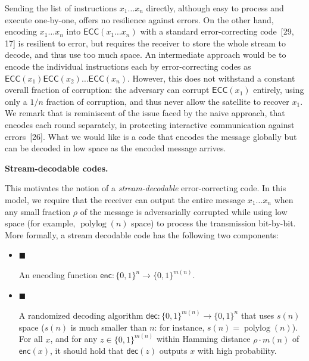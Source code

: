\documentclass[10pt,a4paper]{article}
\begin{document}
Sending the list of instructions $x_{1}\ldots x_{n}$ directly, although easy to process and execute one-by-one, offers no resilience against errors. On the other hand, encoding $x_{1}\ldots x_{n}$ into $\mathsf{ECC}(x_{1}\ldots x_{n})$ with a standard error-correcting code [29, 17] is resilient to error, but requires the receiver to store the whole stream to decode, and thus use too much space. An intermediate approach would be to encode the individual instructions each by error-correcting codes as $\mathsf{ECC}(x_{1})\mathsf{ECC}(x_{2})\ldots\mathsf{ECC}(x_{n})$. However, this does not withstand a constant overall fraction of corruption: the adversary can corrupt $\mathsf{ECC}(x_{1})$ entirely, using only a $1/n$ fraction of corruption, and thus never allow the satellite to recover $x_{1}$. We remark that is reminiscent of the issue faced by the naive approach, that encodes each round separately, in protecting interactive communication against errors [26].
What we would like is a code that encodes the message globally but can be decoded in low space as the encoded message arrives.\par




\par\medskip\noindent\textbf{Stream-decodable codes.}\par




This motivates the notion of a \emph{stream-decodable} error-correcting code. In this model, we require that the receiver can output the entire message $x_{1}\ldots x_{n}$ when any small fraction $\rho$ of the message is adversarially corrupted while using low space (for example, $\operatorname{polylog}(n)$ space) to process the transmission bit-by-bit.
More formally, a stream decodable code has the following two components:\par


\begin{itemize}


\item[] 
$\blacksquare$ 


An encoding function $\mathsf{enc}:\{0,1\}^{n}\to\{0,1\}^{m(n)}$.\par





\item[] 
$\blacksquare$ 


A randomized decoding algorithm $\mathsf{dec}:\{0,1\}^{m(n)}\to\{0,1\}^{n}$ that uses $s(n)$ space ($s(n)$ is much smaller than $n$: for instance, $s(n)=\operatorname{polylog}(n)$). For all $x$, and for any $z\in\{0,1\}^{m(n)}$ within Hamming distance $\rho\cdot m(n)$ of $\mathsf{enc}(x)$, it should hold that $\mathsf{dec}(z)$ outputs $x$ with high probability.\par





\end{itemize}
\end{document}
